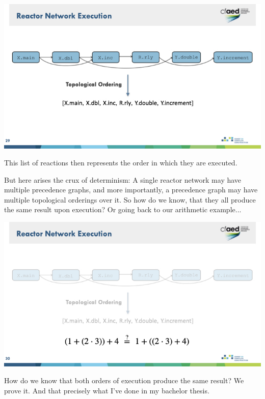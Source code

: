 \documentclass{article}
\begin{document}
\begin{center}
    \includegraphics[width=\columnwidth]{Slides/Slide 29.jpeg}
\end{center}

This list of reactions then represents the order in which they are executed.

But here arises the crux of determinism:
A single reactor network may have multiple precedence graphs, and more importantly, a precedence graph may have multiple topological orderings over it.
So how do we know, that they all produce the same result upon execution?
Or going back to our arithmetic example... 

\begin{center}
    \includegraphics[width=\columnwidth]{Slides/Slide 30.jpeg}
\end{center}

How do we know that both orders of execution produce the same result?
We prove it.
And that precisely what I've done in my bachelor thesis.
\end{document}
